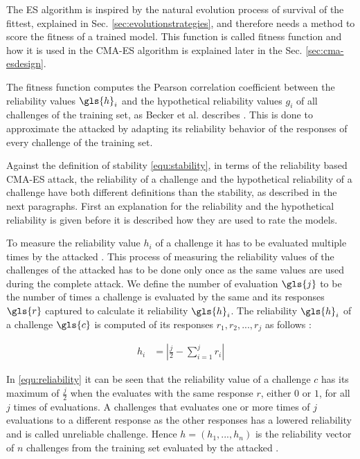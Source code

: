 The \ac{ES} algorithm is inspired by the natural evolution process of survival of the fittest, explained in Sec. \ref{sec:evolutionstrategies}, and therefore needs a method to score the fitness of a trained model.
This function is called fitness function and how it is used in the \ac{CMA-ES} algorithm is explained later in the Sec. \ref{sec:cma-esdesign}.

The fitness function computes the Pearson correlation coefficient between the reliability values $\gls{h}_i$ and the hypothetical reliability values $g_i$ of all challenges of the training set, as Becker et al. describes \cite{Becker2015ThePUFs}.
This is done to approximate the attacked \puf by adapting its reliability behavior of the responses of every challenge of the training set. %

Against the definition of stability \ref{equ:stability}, in terms of the reliability based \ac{CMA-ES} attack, the reliability of a challenge and the hypothetical reliability of a challenge have both different definitions than the stability, as described in the next paragraphs. 
First an explanation for the reliability and the hypothetical reliability is given before it is described how they are used to rate the models.

To measure the reliability value $h_i$ of a challenge it has to be evaluated multiple times by the attacked \puf.
This process of measuring the reliability values of the challenges of the attacked \puf has to be done only once as the same values are used during the complete attack. %
We define the number of evaluation $\gls{j}$ to be the number of times a challenge is evaluated by the same \puf and its responses $\gls{r}$ captured to calculate it reliability $\gls{h}_i$.
The reliability $\gls{h}_i$ of a challenge $\gls{c}$ is computed of its responses $r_1, r_2, ..., r_j$ as follows \cite{Becker2015ThePUFs}:

\begin{align}
h_i &= |\frac{j}{2} - \sum_{i = 1}^{j}r_i| \label{equ:reliability}
\end{align}

In \ref{equ:reliability} it can be seen that the reliability value of a challenge $c$ has its maximum of $\frac{j}{2}$ when the \puf evaluates with the same response $r$, either $0$ or $1$, for all $j$ times of evaluations. %
A challenges that evaluates one or more times of $j$ evaluations to a different response as the other responses has a lowered reliability and is called unreliable challenge.
Hence $h = (h_1, ..., h_n)$ is the reliability vector of $n$ challenges from the training set evaluated by the attacked \puf.


